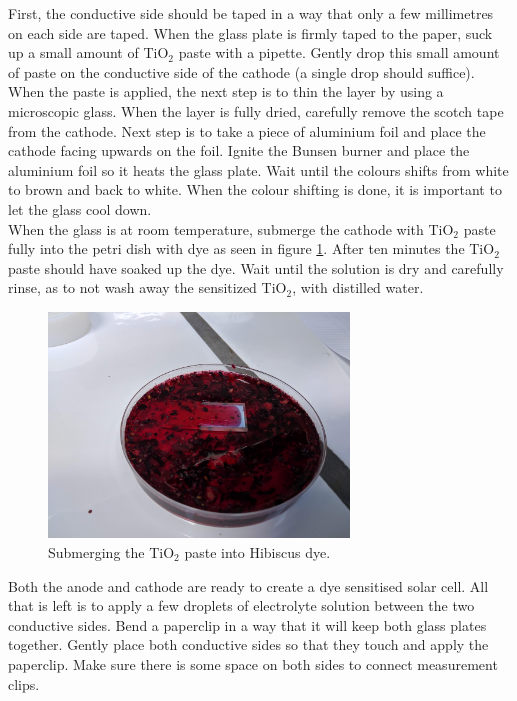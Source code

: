 \documentclass[conference]{IEEEtran}
\begin{document}
First, the conductive side should be taped in a way that only a few millimetres on each side are taped. When the glass plate is firmly taped to the paper, suck up a small amount of TiO$_2$ paste with a pipette. Gently drop this small amount of paste on the conductive side of the cathode (a single drop should suffice). When the paste is applied, the next step is to thin the layer by using a microscopic glass. When the layer is fully dried, carefully remove the scotch tape from the cathode. Next step is to take a piece of aluminium foil and place the cathode facing upwards on the foil. Ignite the Bunsen burner and place the aluminium foil so it heats the glass plate. Wait until the colours shifts from white to brown and back to white. When the colour shifting is done, it is important to let the glass cool down.\\

When the glass is at room temperature, submerge the cathode with TiO$_2$ paste fully into the petri dish with dye as seen in figure \ref{fig:submergingTiOHib}. After ten minutes the TiO$_2$ paste should have soaked up the dye. Wait until the solution is dry and carefully rinse, as to not wash away the sensitized TiO$_2$, with distilled water.\\


\begin{figure}[H]
\centering
\includegraphics[width=8.0cm]{img/5SubmergingTiOHib.jpg}
\caption{Submerging the TiO$_2$ paste into Hibiscus dye.}
\label{fig:submergingTiOHib} %
\end{figure}

Both the anode and cathode are ready to create a dye sensitised solar cell. All that is left is to apply a few droplets of electrolyte solution between the two conductive sides. Bend a paperclip in a way that it will keep both glass plates together. Gently place both conductive sides so that they touch and apply the paperclip. Make sure there is some space on both sides to connect measurement clips.\\
\end{document}
